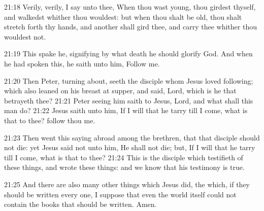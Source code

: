 21:18 Verily, verily, I say unto thee, When thou wast young, thou girdest thyself, and walkedst whither thou wouldest: but when thou shalt be old, thou shalt stretch forth thy hands, and another shall gird thee, and carry thee whither thou wouldest not.

21:19 This spake he, signifying by what death he should glorify God.  And when he had spoken this, he saith unto him, Follow me.

21:20 Then Peter, turning about, seeth the disciple whom Jesus loved following; which also leaned on his breast at supper, and said, Lord, which is he that betrayeth thee?  21:21 Peter seeing him saith to Jesus, Lord, and what shall this man do?  21:22 Jesus saith unto him, If I will that he tarry till I come, what is that to thee? follow thou me.

21:23 Then went this saying abroad among the brethren, that that disciple should not die: yet Jesus said not unto him, He shall not die; but, If I will that he tarry till I come, what is that to thee?  21:24 This is the disciple which testifieth of these things, and wrote these things: and we know that his testimony is true.

21:25 And there are also many other things which Jesus did, the which, if they should be written every one, I suppose that even the world itself could not contain the books that should be written. Amen.


